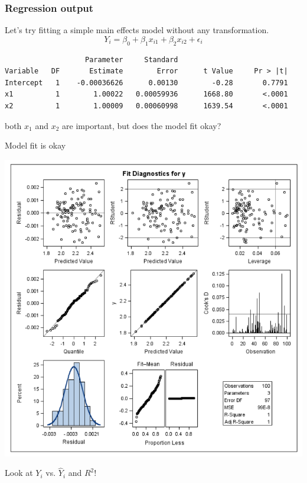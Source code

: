 \documentclass{beamer}
\begin{document}
\begin{frame}[fragile]
\frametitle{Regression output}
Let's try fitting a simple main effects model without any transformation.
$$
Y_i=\beta_0 + \beta_1 x_{i1} + \beta_2 x_{i2} + \epsilon_i
$$

\begin{footnotesize}
\begin{verbatim}
                   Parameter     Standard
Variable   DF       Estimate        Error      t Value     Pr > |t|
Intercept   1    -0.00036626      0.00130        -0.28       0.7791
x1          1        1.00022   0.00059936      1668.80       <.0001
x2          1        1.00009   0.00060998      1639.54       <.0001
\end{verbatim}
\end{footnotesize}

both $x_1$ and $x_2$ are important, but does the model fit okay?
\end{frame}


\begin{frame}{Model fit is okay}
\centerline{\includegraphics[scale=0.25]{plots/diag}}
\vspace{10pt}

Look at $Y_i$ vs. $\hat{Y}_i$ and $R^2$!
\end{frame}
\end{document}
